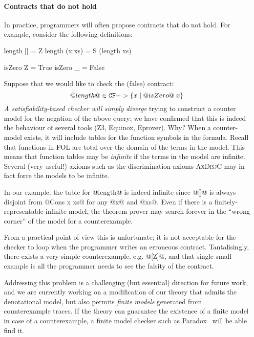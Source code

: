 \paragraph{Contracts that do not hold}
\label{ssect:countersat}

In practice, programmers will often propose contracts that do not hold.
For example, consider the following definitions:
\begin{code}
  length []     = Z
  length (x:xs) = S (length xs)

  isZero Z = True
  isZero _ = False
\end{code}
Suppose that we would like to check the (false) contract:
   \[ @length@ \in {\tt CF} -> \{ x \mid @isZero@\;x\} \]
\emph{A satisfiability-based checker
will simply diverge} trying to construct a counter model for the
negation of the above query; we have confirmed that this is indeed the
behaviour of several tools (Z3, Equinox, Eprover).  Why?  When a
counter-model exists, it will include tables for the function symbols
in the formula. Recall that functions in FOL are total over the domain
of the terms in the model. This means that function tables may be {\em
infinite} if the terms in the model are infinite. Several (very
useful!)  axioms such as the discrimination axioms \textsc{AxDisjC}
may in fact force the models to be infinite.

In our example, the table for @length@ is indeed infinite since @[]@ is
always disjoint from @Cons x xs@ for any @x@ and @xs@. Even if there
is a finitely-representable infinite model, the theorem prover may
search forever in the ``wrong corner'' of the model for a
counterexample.

From a practical point of view this is unfortunate; it is not
acceptable for the checker to loop when the programmer writes an
erroneous contract.  Tantalisingly, there exists a very simple
counterexample, e.g. @[Z]@, and that single small example is all the
programmer needs to see the falsity of the contract.

Addressing this problem is a challenging (but essential)
direction for future work, and we are currently
working on a modification of our theory that admits the denotational model, but
also permits {\em finite models} generated from counterexample traces.
If the theory can guarantee the existence of a finite model in case of a counterexample,
a finite model checker such as Paradox~\cite{paradox} will be able find it.

